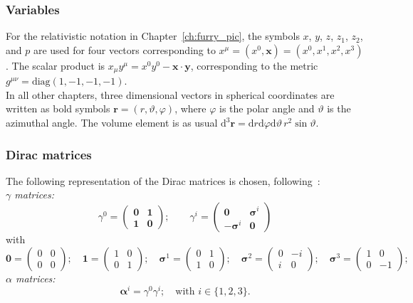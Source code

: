 \subsubsection*{Variables}
For the relativistic notation in Chapter~\ref{ch:furry_pic}, the symbols $x$, $y$, $z$, $z_1$, $z_2$, and $p$ are used for four vectors corresponding to $x^\mu=(x^0,\mathbf{x})=(x^0,x^1,x^2,x^3)$. The scalar product is $x_\mu y^\mu = x^0 y^0 - \mathbf{x}\cdot\mathbf{y}$, corresponding to the metric $g^{\mu\nu}=\text{diag}(1,-1,-1,-1)$.\\
In all other chapters, three dimensional vectors in spherical coordinates are written as bold symbols $\mathbf{r}=(r,\vartheta,\varphi)$, where $\varphi$ is the polar angle and $\vartheta$ is the azimuthal angle. The volume element is as usual $\text{d}^3\mathbf{r}=\text{d}r\text{d}\varphi\text{d}\vartheta\, r^2 \sin\vartheta $.
\subsubsection*{Dirac matrices}
The following representation of the Dirac matrices is chosen, following~\cite{peskin1995}:\\
\textit{$\gamma$ matrices:}
\begin{equation}
\gamma^0 =
\begin{pmatrix}
\boldsymbol{0}&\boldsymbol{1}\\
\boldsymbol{1}&\boldsymbol{0}
\end{pmatrix};\qquad
\gamma^{i} = 
\begin{pmatrix}
\boldsymbol{0}&\boldsymbol{\sigma}^i\\
-\boldsymbol{\sigma}^i&\boldsymbol{0}
\end{pmatrix}
\end{equation}
with
\begin{equation}
\boldsymbol{0}=
\begin{pmatrix}
0&0\\0&0
\end{pmatrix};\quad
\boldsymbol{1}=
\begin{pmatrix}
1&0\\0&1
\end{pmatrix};\quad
\boldsymbol{\sigma}^1=
\begin{pmatrix}
0&1\\1&0
\end{pmatrix};\quad
\boldsymbol{\sigma}^2=
\begin{pmatrix}
0&-i\\i&0
\end{pmatrix};\quad
\boldsymbol{\sigma}^3=
\begin{pmatrix}
1&0\\0&-1
\end{pmatrix};\quad
\end{equation}
\textit{$\alpha$ matrices:}
\begin{equation}
\boldsymbol{\alpha}^i = \gamma^0 \gamma^i;\quad\text{with }i \in \{1,2,3\}.
\end{equation}

